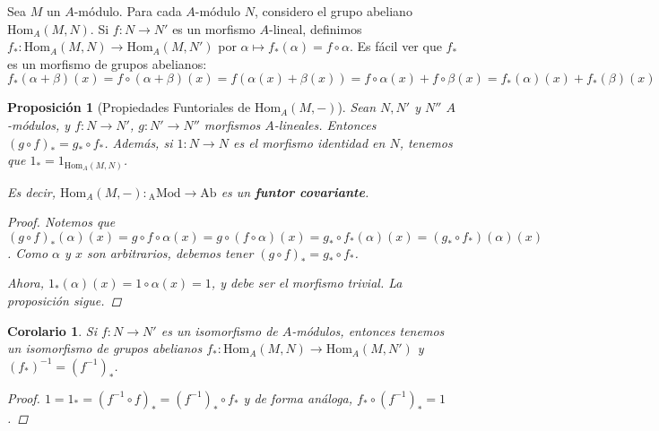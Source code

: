 \documentclass[12pt]{book}
\newtheorem{prop}[teo]{Proposición}
\newtheorem{cor}[teo]{Corolario}
\theoremstyle{definition}
\renewcommand{\hom}{\mathrm{Hom}}
\begin{document}
Sea $M$ un $A$-módulo. Para cada $A$-módulo $N$, considero el grupo abeliano $\hom_A(M,N)$. Si $f:N\to N'$ es un morfismo $A$-lineal, definimos $f_*:\hom_A(M,N)\to\hom_A(M,N')$ por $\alpha\mapsto f_*(\alpha)=f\circ \alpha$. Es fácil ver que $f_*$ es un morfismo de grupos abelianos: $$f_*(\alpha+\beta)(x) = f\circ(\alpha+\beta)(x) = f(\alpha(x)+\beta(x)) = f\circ \alpha (x) + f\circ\beta (x) = f_*(\alpha)(x)+f_*(\beta)(x)$$
\begin{prop}[Propiedades Funtoriales de $\hom_A(M,-)$]
Sean $N,N'$ y $N''$ $A$-módulos, y $f:N\to N'$, $g:N'\to N''$ morfismos $A$-lineales. Entonces $(g\circ f)_* = g_*\circ f_*$. Además, si $1:N\to N$ es el morfismo identidad en $N$, tenemos que $1_* = 1_{\hom_A(M,N)}$.

Es decir, $\hom_A(M,-):\mathrm{_{A}Mod}\to \mathrm{Ab}$ es un \textbf{funtor covariante}.
\begin{proof}

Notemos que $(g\circ f)_*(\alpha)(x) = g\circ f\circ \alpha (x) = g\circ (f\circ \alpha)(x) = g_* \circ f_*(\alpha) (x) = (g_*\circ f_*)(\alpha)(x)$. Como $\alpha$ y $x$ son arbitrarios, debemos tener $(g\circ f)_* = g_* \circ f_*$.

Ahora, $1_*(\alpha)(x) = 1\circ \alpha (x) = 1$, y debe ser el morfismo trivial. La proposición sigue.
\end{proof}
\end{prop}

\begin{cor}
Si $f:N\to N'$ es un isomorfismo de $A$-módulos, entonces tenemos un isomorfismo de grupos abelianos $f_*:\hom_A(M,N)\to \hom_A(M,N')$ y $(f_*)^{-1} = (f^{-1})_*$.
\begin{proof}
$1 = 1_* = (f^{-1}\circ f)_* = (f^{-1})_*\circ f_*$ y de forma análoga, $f_*\circ (f^{-1})_* = 1$.
\end{proof}
\end{cor}
\end{document}
